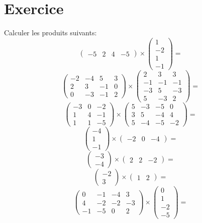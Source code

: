 \documentclass{article}
\begin{document}
\section{Exercice}

Calculer les produits suivants:\\$$ \begin{pmatrix}-5&2&4&-5
\end{pmatrix}\times\begin{pmatrix}1 \\ 
-2 \\ 
1 \\ 
-1
\end{pmatrix} = $$
$$ \begin{pmatrix}-2&-4&5&3 \\ 
2&3&-1&0 \\ 
0&-3&-1&2
\end{pmatrix}\times\begin{pmatrix}2&3&3 \\ 
-1&-1&-1 \\ 
-3&5&-3 \\ 
5&-3&2
\end{pmatrix} = $$
$$ \begin{pmatrix}-3&0&-2 \\ 
1&4&-1 \\ 
1&1&-5
\end{pmatrix}\times\begin{pmatrix}5&-3&-5&0 \\ 
3&5&-4&4 \\ 
5&-4&-5&-2
\end{pmatrix} = $$
$$ \begin{pmatrix}-4 \\ 
1 \\ 
-1
\end{pmatrix}\times\begin{pmatrix}-2&0&-4
\end{pmatrix} = $$
$$ \begin{pmatrix}-3 \\ 
-4
\end{pmatrix}\times\begin{pmatrix}2&2&-2
\end{pmatrix} = $$
$$ \begin{pmatrix}-2 \\ 
3
\end{pmatrix}\times\begin{pmatrix}1&2
\end{pmatrix} = $$
$$ \begin{pmatrix}0&-1&-4&3 \\ 
4&-2&-2&-3 \\ 
-1&-5&0&2
\end{pmatrix}\times\begin{pmatrix}0 \\ 
1 \\ 
-2 \\ 
-5
\end{pmatrix} = $$
\end{document}
